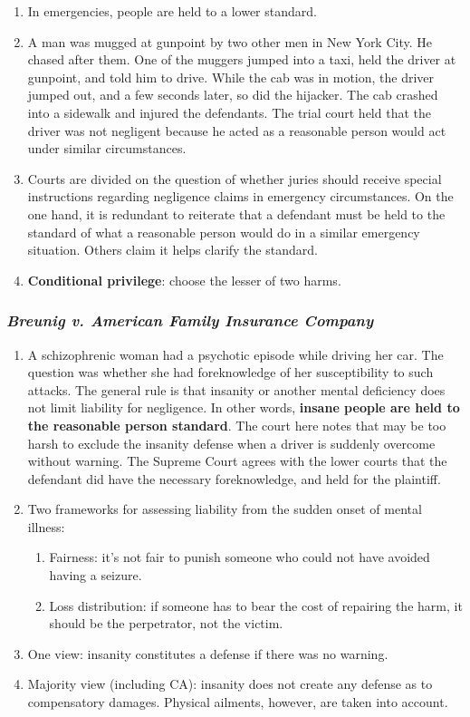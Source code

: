 \begin{enumerate}
    \item In emergencies, people are held to a lower standard.
    \item A man was mugged at gunpoint by two other men in New York City. He chased after them. One of the muggers jumped into a taxi, held the driver at gunpoint, and told him to drive. While the cab was in motion, the driver jumped out, and a few seconds later, so did the hijacker. The cab crashed into a sidewalk and injured the defendants. The trial court held that the driver was not negligent because he acted as a reasonable person would act under similar circumstances.
    \item Courts are divided on the question of whether juries should receive special instructions regarding negligence claims in emergency circumstances. On the one hand, it is redundant to reiterate that a defendant must be held to the standard of what a reasonable person would do in a similar emergency situation. Others claim it helps clarify the standard.
    \item \textbf{Conditional privilege}: choose the lesser of two harms.
\end{enumerate}

\subsubsection{\emph{Breunig v. American Family Insurance Company}}

\begin{enumerate}
    \item A schizophrenic woman had a psychotic episode while driving her car. The question was whether she had foreknowledge of her susceptibility to such attacks. The general rule is that insanity or another mental deficiency does not limit liability for negligence. In other words, \textbf{insane people are held to the reasonable person standard}. The court here notes that may be too harsh to exclude the insanity defense when a driver is suddenly overcome without warning. The Supreme Court agrees with the lower courts that the defendant did have the necessary foreknowledge, and held for the plaintiff. 
    \item Two frameworks for assessing liability from the sudden onset of mental illness:
    \begin{enumerate}
        \item Fairness: it's not fair to punish someone who could not have avoided having a seizure.
        \item Loss distribution: if someone has to bear the cost of repairing the harm, it should be the perpetrator, not the victim.
    \end{enumerate}
    \item One view: insanity constitutes a defense if there was no warning.
    \item Majority view (including CA): insanity does not create any defense as to compensatory damages. Physical ailments, however, are taken into account.
\end{enumerate}

